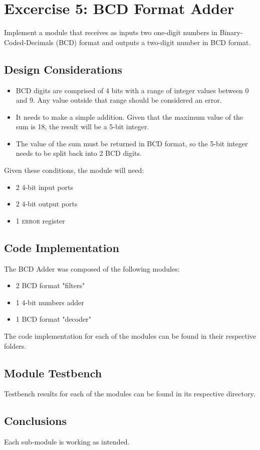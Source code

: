 \section {\color{olive}Excercise 5: BCD Format Adder}
Implement a module that receives as inputs two one-digit numbers in Binary-Coded-Decimals (BCD) format and outputs a two-digit number in BCD format.

\subsection{\color{purple}Design Considerations}
\begin{itemize}
\item BCD digits are comprised of 4 bits with a range of integer values between 0 and 9. Any value outside that range should be considered an error.
\item It needs to make a simple addition. Given that the maximum value of the sum is 18, the result will be a 5-bit integer.
\item The value of the sum must be returned in BCD format, so the 5-bit integer needs to be split back into 2 BCD digits.
\end{itemize}

Given these conditions, the module will need:
\begin{itemize}
\item 2 4-bit input ports
\item 2 4-bit output ports
\item 1 \textsc{error} register
\end{itemize}

\subsection{\color{purple}Code Implementation}
The BCD Adder was composed of the following modules:
\begin{itemize}
\item 2 BCD format "filters"
\item 1 4-bit numbers adder
\item 1 BCD format "decoder"
\end{itemize}

The code implementation for each of the modules can be found in their respective folders.

\subsection{\color{purple}Module Testbench}
Testbench results for each of the modules can be found in its respective directory.

\subsection{\color{purple}Conclusions}
Each sub-module is working as intended.
